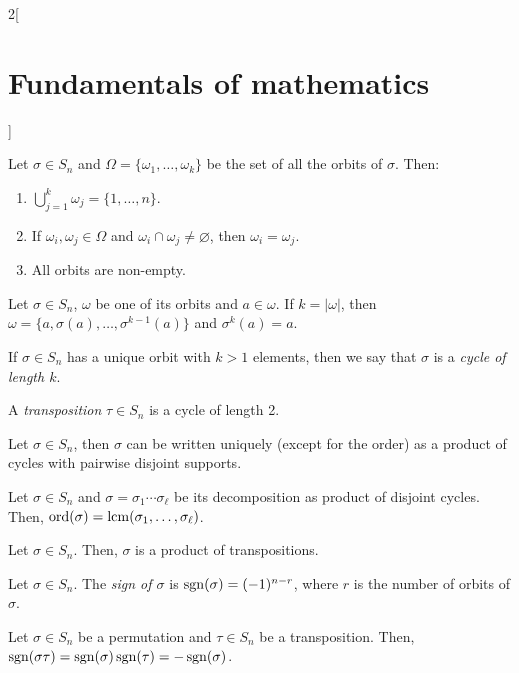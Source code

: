 \documentclass[../../../main.tex]{subfiles}
\begin{document}
\begin{multicols}{2}[\section{Fundamentals of mathematics}]
\begin{definition}
  \end{definition}
  \begin{theorem}
    Let $\sigma\in S_n$ and $\Omega=\{\omega_1,\ldots,\omega_k\}$ be the set of all the orbits of $\sigma$. Then:
    \begin{enumerate}
      \item $\bigcup_{j=1}^k \omega_j=\{1,\ldots,n\}$.
      \item If $\omega_i,\omega_j\in\Omega$ and $\omega_i\cap\omega_j\ne\varnothing$, then $\omega_i=\omega_j$.
      \item All orbits are non-empty.
    \end{enumerate}
  \end{theorem}
  \begin{theorem}
    Let $\sigma\in S_n$, $\omega$ be one of its orbits and $a\in\omega$. If $k=|\omega|$, then $\omega=\{a,\sigma(a),\ldots,\sigma^{k-1}(a)\}$ and $\sigma^k(a)=a$.
  \end{theorem}
  \begin{definition}
    If $\sigma\in S_n$ has a unique orbit with $k>1$ elements, then we say that $\sigma$ is a \textit{cycle of length $k$}.
  \end{definition}
  \begin{definition}
    A \textit{transposition} $\tau\in S_n$ is a cycle of length 2.
  \end{definition}
  \begin{theorem}
    Let $\sigma\in S_n$, then $\sigma$ can be written uniquely (except for the order) as a product of cycles with pairwise disjoint supports.
  \end{theorem}
  \begin{corollary}
    Let $\sigma\in S_n$ and $\sigma=\sigma_1\cdots\sigma_\ell$ be its decomposition as product of disjoint cycles. Then, $\text{ord}(\sigma)=\operatorname{lcm}(\sigma_1,\ldots,\sigma_\ell)$.
  \end{corollary}
  \begin{corollary}
    Let $\sigma\in S_n$. Then, $\sigma$ is a product of transpositions.
  \end{corollary}
  \begin{definition}
    Let $\sigma\in S_n$. The \textit{sign of $\sigma$} is $\operatorname{sgn}(\sigma)=(-1)^{n-r}$, where $r$ is the number of orbits of $\sigma$.
  \end{definition}
  \begin{theorem}
    Let $\sigma\in S_n$ be a permutation and $\tau\in S_n$ be a transposition. Then, $\operatorname{sgn}(\sigma\tau)=\operatorname{sgn}(\sigma)\operatorname{sgn}(\tau)=-\operatorname{sgn}(\sigma)$.

\end{theorem}
\end{multicols}
\end{document}
